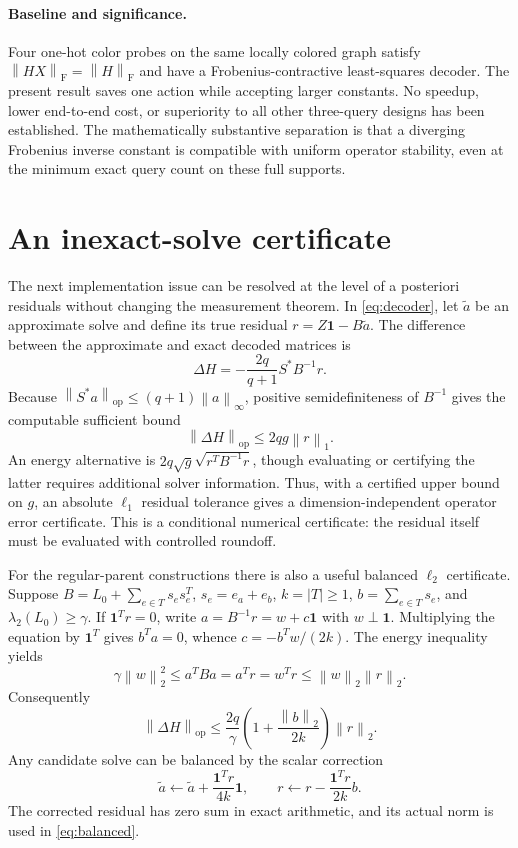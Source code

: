 \documentclass[11pt]{article}
\theoremstyle{remark}\newtheorem{remark}[theorem]{Remark}
\newcommand{\one}{\mathbf 1}
\newcommand{\op}{\mathrm{op}}
\newcommand{\F}{\mathrm F}
\newcommand{\norm}[1]{\left\lVert #1\right\rVert}
\begin{document}
\paragraph{Baseline and significance.}
Four one-hot color probes on the same locally colored graph satisfy
$\norm{HX}_{\F}=\norm H_{\F}$ and have a Frobenius-contractive least-squares decoder. The present result saves one action while accepting larger constants. No speedup, lower end-to-end cost, or superiority to all other three-query designs has been established. The mathematically substantive separation is that a diverging Frobenius inverse constant is compatible with uniform operator stability, even at the minimum exact query count on these full supports.

\section{An inexact-solve certificate}

The next implementation issue can be resolved at the level of a posteriori residuals without changing the measurement theorem. In \eqref{eq:decoder}, let $\widetilde a$ be an approximate solve and define its true residual $r=Z\one-B\widetilde a$. The difference between the approximate and exact decoded matrices is
\[
\Delta H=-\frac{2q}{q+1}S^*B^{-1}r.
\]
Because $\norm{S^*a}_{\op}\leq(q+1)\norm a_\infty$, positive semidefiniteness of $B^{-1}$ gives the computable sufficient bound
\begin{equation}\label{eq:residual-l1}
\norm{\Delta H}_{\op}\leq2qg\norm r_1.
\end{equation}
An energy alternative is $2q\sqrt g\sqrt{r^TB^{-1}r}$, though evaluating or certifying the latter requires additional solver information. Thus, with a certified upper bound on $g$, an absolute $\ell_1$ residual tolerance gives a dimension-independent operator error certificate. This is a conditional numerical certificate: the residual itself must be evaluated with controlled roundoff.

For the regular-parent constructions there is also a useful balanced $\ell_2$ certificate. Suppose $B=L_0+\sum_{e\in T}s_es_e^T$, $s_e=e_a+e_b$, $k=|T|\geq1$, $b=\sum_{e\in T}s_e$, and $\lambda_2(L_0)\geq\gamma$. If $\one^Tr=0$, write $a=B^{-1}r=w+c\one$ with $w\perp\one$. Multiplying the equation by $\one^T$ gives $b^Ta=0$, whence $c=-b^Tw/(2k)$. The energy inequality yields
\[
\gamma\norm w_2^2\leq a^TBa=a^Tr=w^Tr\leq\norm w_2\norm r_2.
\]
Consequently
\begin{equation}\label{eq:balanced}
\norm{\Delta H}_{\op}\leq\frac{2q}{\gamma}
\left(1+\frac{\norm b_2}{2k}\right)\norm r_2.
\end{equation}
Any candidate solve can be balanced by the scalar correction
\[
\widetilde a\longleftarrow\widetilde a+\frac{\one^Tr}{4k}\one,
\qquad r\longleftarrow r-\frac{\one^Tr}{2k}b.
\]
The corrected residual has zero sum in exact arithmetic, and its actual norm is used in \eqref{eq:balanced}.
\end{document}

